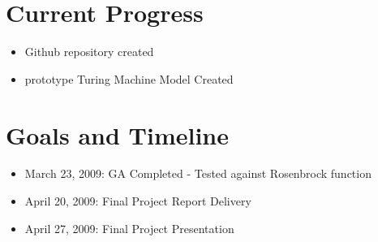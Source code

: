 \section{Current Progress} 
\begin{itemize}
	\item Github repository created
	\item prototype Turing Machine Model Created
\end{itemize}

\section{Goals and Timeline}
\begin{itemize}
	\item March 23, 2009: GA Completed - Tested against Rosenbrock function
	\item April 20, 2009: Final Project Report Delivery
	\item April 27, 2009: Final Project Presentation
\end{itemize}
